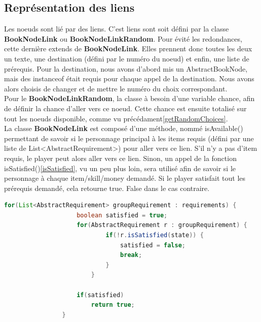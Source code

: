 		\subsection{Représentation des liens}
			Les noeuds sont lié par des liens. C'est liens sont soit défini par la classe \textbf{BookNodeLink} ou \textbf{BookNodeLinkRandom}. Pour évité les redondances, cette dernière extends de \textbf{BookNodeLink}. Elles prennent donc toutes les deux un texte, une destination (défini par le numéro du noeud) et enfin, une liste de prérequis.  Pour la destination, nous avons d'abord mis un AbstractBookNode, mais des instanceof était requis pour chaque appel de la destination. Nous avons alors choisis de changer et de mettre le numéro du choix correspondant.\\
			Pour le \textbf{BookNodeLinkRandom}, la classe à besoin d'une variable chance, afin de définir la chance d'aller vers ce noeud. Cette chance est ensuite totalisé sur tout les noeuds disponible, comme vu précédament\ref{getRandomChoices}.\\
			La classe \textbf{BookNodeLink} est composé d'une méthode, nommé isAvailable() permettant de savoir si le personnage principal à les items requis (défini par une liste de List<AbstractRequirement>) pour aller vers ce lien. S'il n'y a pas d'item requis, le player peut alors aller vers ce lien. Sinon, un appel de la fonction isSatisfied()\ref{isSatisfied}, vu un peu plus loin, sera utilisé afin de savoir si le personnage à chaque item/skill/money demandé. Si le player satisfait tout les prérequis demandé, cela retourne true. False dans le cas contraire.\\
			\begin{lstlisting}[language=java, caption=exemple de isAvailable(), label=isAvailable]
				for(List<AbstractRequirement> groupRequirement : requirements) {
					boolean satisfied = true;
					for(AbstractRequirement r : groupRequirement) {
							if(!r.isSatisfied(state)) {
								satisfied = false;
								break;
							}
						}

					if(satisfied)
						return true;
				}
				\end{lstlisting}



